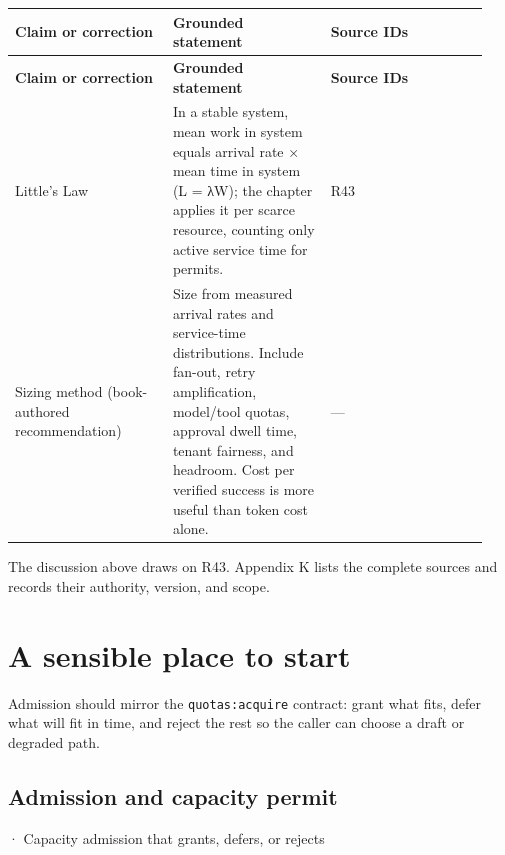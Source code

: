 \BookTableStart
\small
\begin{longtable}{@{}Y{0.3133\linewidth}Y{0.3133\linewidth}Y{0.3133\linewidth}@{}}
\color{white}\bfseries \textbf{Claim or correction} & \color{white}\bfseries \textbf{Grounded statement} & \color{white}\bfseries \textbf{Source IDs} \\
\endfirsthead
{}
\color{white}\bfseries \textbf{Claim or correction} & \color{white}\bfseries \textbf{Grounded statement} & \color{white}\bfseries \textbf{Source IDs} \\
\endhead
Little’s Law & In a stable system, mean work in system equals arrival rate × mean time in system (L = λW); the chapter applies it per scarce resource, counting only active service time for permits. & R43 \\
Sizing method (book-authored recommendation) & Size from measured arrival rates and service-time distributions. Include fan-out, retry amplification, model/tool quotas, approval dwell time, tenant fairness, and headroom. Cost per verified success is more useful than token cost alone. & — \\
\end{longtable}
\BookTableEnd

The discussion above draws on R43. Appendix K lists the complete sources and records their authority, version, and scope.\par

\section{A sensible place to start}

Admission should mirror the \lstinline[style=bookinline]!quotas:acquire! contract: grant what fits, defer what will fit in time, and reject the rest so the caller can choose a draft or degraded path.\par

\subsection{Admission and capacity permit}

\BookSnake · Capacity admission that grants, defers, or rejects\par

